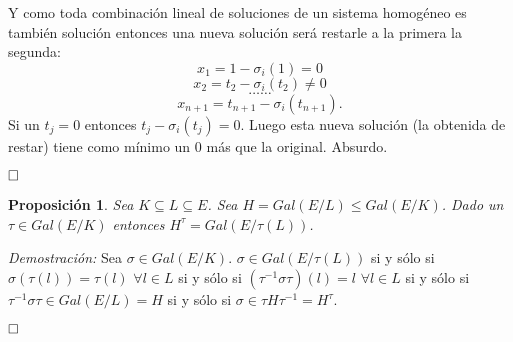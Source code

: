 \documentclass[12pt]{article}
\newtheorem{proposition}[theorem]{Proposición}
\begin{document}
Y como toda combinación lineal de soluciones de un sistema homogéneo es también solución entonces una nueva solución será restarle a la primera la segunda: $$x_{1} = 1-\sigma_{i}(1) = 0$$ $$x_{2}=t_{2}-\sigma_{i}(t_{2}) \neq 0$$ $$ \ldots \ldots$$ $$x_{n+1} = t_{n+1} - \sigma_{i}(t_{n+1}).$$ Si un $t_j =0$ entonces $t_j - \sigma_i(t_j)=0$. Luego esta nueva solución (la obtenida de restar) tiene como mínimo un $0$ más que la original. Absurdo.

$\hfill \square$

\begin{proposition}\label{eq:preGal3}Sea $K \subseteq L \subseteq E$. Sea $H = Gal(E/L) \leq Gal(E/K)$. Dado un $\tau \in Gal(E/K)$ entonces $H^\tau = Gal(E/\tau(L))$.
\end{proposition}
\emph{Demostración: }Sea $\sigma \in Gal(E/K)$. $\sigma \in Gal(E/\tau(L))$ si y sólo si $\sigma (\tau (l)) = \tau (l)$ \hspace{0.1cm} $\forall l \in L$ si y sólo si $(\tau^{-1}\sigma \tau )(l) = l$ $\forall l \in L$ si y sólo si $\tau^{-1}\sigma \tau \in Gal(E/L) = H$ si y sólo si $\sigma \in \tau H \tau^{-1} = H^\tau.$

$\hfill \square$
\end{document}
